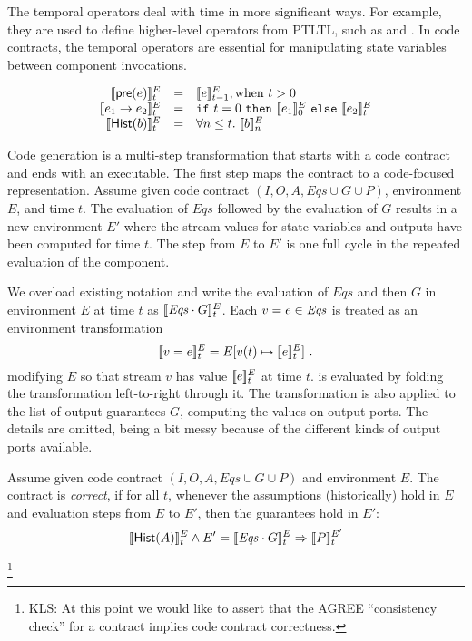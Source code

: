 The temporal operators deal with time in more significant ways. For
example, they are used to define higher-level operators from PTLTL,
such as  and . In code contracts, the
temporal operators are essential for manipulating state variables
between component invocations.

\[
\begin{array}{rcl}
\sem{\konst{pre}(e)}^E_t & = & \sem{e}^E_{t-1}, \mathrm{when}\ t > 0 \\
\sem{e_1 \to e_2}^E_t & = & \itelse{t=0}{\sem{e_1}^E_0}{\sem{e_2}^E_t} \\
\sem{\konst{Hist}(b)}^E_t & = & \forall n \leq t.\; \sem{b}^E_n
\end{array}
\]

Code generation is a multi-step transformation that starts with a code
contract and ends with an executable. The first step maps the contract
to a code-focused representation. Assume given code contract
$(I,O,A,\mathit{Eqs} \cup G \cup P)$, environment $E$, and time
$t$. The evaluation of $\mathit{Eqs}$ followed by the evaluation of
$G$ results in a new environment $E'$ where the stream values for
state variables and outputs have been computed for time $t$. The step
from $E$ to $E'$ is one full cycle in the repeated evaluation of the
component.

\begin{definition}[Evaluation]
We overload existing notation and write the evaluation of
$\mathit{Eqs}$ and then $G$ in environment $E$ at time $t$ as
$[\![ \mathit{Eqs}\cdot G ]\!]^E_t$. Each $v = e \in {\ensuremath{\mathit{Eqs}}}$ is treated as
an environment transformation
\[
 [\![ v = e ]\!]^E_t = E[v(t) \mapsto[\![ e ]\!]^E_t] \ .
\]
modifying $E$ so that stream $v$ has value $[\![ e ]\!]^E_t$ at time $t$.
{\Eqs} is evaluated by folding the transformation left-to-right
through it. The transformation is also applied to the list of output
guarantees $G$, computing the values on output ports. The details are
omitted, being a bit messy because of the different kinds of output
ports available.
\end{definition}


\begin{definition}
Assume given code contract $(I,O,A,\mathit{Eqs} \cup G \cup P)$ and
environment $E$.  The contract is \emph{correct}, if for all $t$,
whenever the assumptions (historically) hold in $E$ and evaluation
steps from $E$ to $E'$, then the guarantees hold in $E'$:
\[
[\![ \mathsf{Hist}(A) ]\!]^E_t \land E' = [\![ \mathit{Eqs} \cdot G ]\!]^E_t \Rightarrow [\![ P ]\!]^{E'}_t
\]
\end{definition}
\footnote
{KLS: At this point we would like to assert that the AGREE ``consistency
 check'' for a contract implies code contract correctness.}

